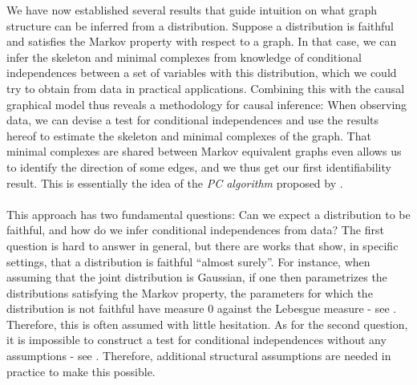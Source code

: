 \documentclass[11pt, a4paper]{memoir}
\theoremstyle{break}
\theoremstyle{break}
\theoremstyle{nonumberplain}
\begin{document}
We have now established several results that guide intuition on what graph structure can be inferred from a distribution. Suppose a distribution is faithful and satisfies the Markov property with respect to a graph. In that case, we can infer the skeleton and minimal complexes from knowledge of conditional independences between a set of variables with this distribution, which we could try to obtain from data in practical applications. Combining this with the causal graphical model thus reveals a methodology for causal inference: 
When observing data, we can devise a test for conditional independences and use the results hereof to estimate the skeleton and minimal complexes of the graph. That minimal complexes are shared between Markov equivalent graphs even allows us to identify the direction of some edges, and we thus get our first identifiability result. This is essentially the idea of the \emph{PC algorithm} proposed by \cite{PC}.\\\\
This approach has two fundamental questions: Can we expect a distribution to be faithful, and how do we infer conditional independences from data? The first question is hard to answer in general, but there are works that show, in specific settings, that a distribution is faithful \enquote{almost surely}. For instance, when assuming that the joint distribution is Gaussian, if one then parametrizes the distributions satisfying the Markov property, the parameters for which the distribution is not faithful have measure 0 against the Lebesgue measure - see \cite{Faithful1}. Therefore, this is often assumed with little hesitation. As for the second question, it is impossible to construct a test for conditional independences without any assumptions - see \cite{CondIndTest}. Therefore, additional structural assumptions are needed in practice to make this possible. 
\end{document}
